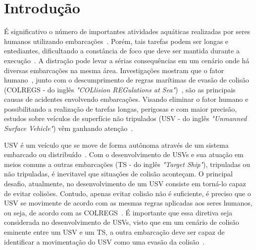 


\chapter{Introdução}\label{chap1:intro}
    É significativo o número de importantes atividades aquáticas realizadas por seres humanos utilizando embarcações~\cite{LIU201671}. Porém, tais tarefas podem ser longas e entediantes, dificultando a constância de foco que deve ser mantida durante a execução~\cite{JURAK2020}. A distração pode levar a sérias consequências em um cenário onde há diversas embarcações na mesma área. Investigações mostram que o fator humano~\cite{HUANG2020451}, junto com o descumprimento de regras marítimas de evasão de colisão (COLREGS - do inglês \textit{"COLlision REGulations at Sea"})~\cite{JURAK2020}, são as principais causas de acidentes envolvendo embarcações.
    Visando eliminar o fator humano e possibilitando a realização de tarefas longas, perigosas e com maior precisão, estudos sobre veículos de superfície não tripulados (USV - do inglês \textit{"Unmanned Surface Vehicle"}) vêm ganhando atenção~\cite{LIU201671}.
    
    USV é um veículo que se move de forma autônoma através de um sistema embarcado ou distribuído~\cite{SONG2018351}. Com o desenvolvimento de USVs e sua atuação em meios comuns a outras embarcações (TS - do inglês \textit{"Target Ship"}), tripuladas ou não tripuladas, é inevitavel que situações de colisão aconteçam. O principal desafio, atualmente, no desenvolvimento de um USV consiste em torná-lo capaz de evitar colisões. Contudo, apenas evitar colisão não é suficiente, é preciso que o USV se movimente de acordo com as mesmas regras aplicadas aos seres humanos, ou seja, de acordo com as COLREGS~\cite{JURAK2020}. É importante que essa diretiva seja considerada no desenvolvimento de USVs, visto que em um cenário de colisão eminente entre um USV e um TS, a outra embarcação deve ser capaz de identificar a movimentação do USV como uma evasão da colisão~\cite{KUWATA2014110}.
    

